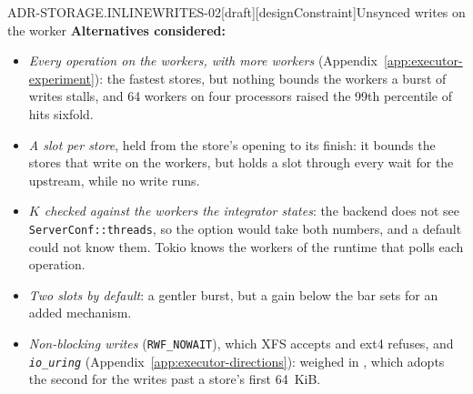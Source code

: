 \begin{requirement}{ADR-STORAGE.INLINEWRITES-02}[draft][designConstraint]{Unsynced writes on the worker}
  \textbf{Alternatives considered:}
  \begin{itemize}
    \item \emph{Every operation on the workers, with more workers}
      (Appendix~\ref{app:executor-experiment}): the fastest stores, but
      nothing bounds the workers a burst of writes stalls, and 64 workers on
      four processors raised the 99th percentile of hits sixfold.
    \item \emph{A slot per store}, held from the store's opening to its
      finish: it bounds the stores that write on the workers, but holds a
      slot through every wait for the upstream, while no write runs.
    \item \emph{$K$ checked against the workers the integrator states}: the
      backend does not see \texttt{ServerConf::threads}, so the option would
      take both numbers, and a default could not know them. Tokio knows the
      workers of the runtime that polls each operation.
    \item \emph{Two slots by default}: a gentler burst, but a gain below the
      bar  sets for an added mechanism.
    \item \emph{Non-blocking writes} (\texttt{RWF\_NOWAIT}), which XFS
      accepts and ext4 refuses, and \emph{\texttt{io\_uring}}
      (Appendix~\ref{app:executor-directions}): weighed in
      , which adopts the second for the
      writes past a store's first 64~KiB.
  \end{itemize}


\end{requirement}
